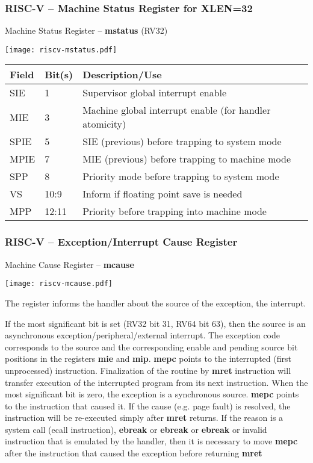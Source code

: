\documentclass{beamer}
\begin{document}
\begin{frame}
\frametitle{RISC-V -- Machine Status Register for XLEN=32}

Machine Status Register -- \textbf{mstatus} (RV32)

\begin{center}
  \texttt{[image: riscv-mstatus.pdf]}
\end{center}

\begin{tabular}{|l|l|l|}  \hline
Field & Bit(s) & Description/Use \\\hline
SIE & 1 & Supervisor global interrupt enable \\\hline
MIE & 3 & Machine global interrupt enable (for handler atomicity) \\\hline
SPIE & 5 & SIE (previous) before trapping to system mode \\\hline
MPIE & 7 & MIE (previous) before trapping to machine mode \\\hline
SPP & 8 & Priority mode before trapping to system mode \\\hline
VS & 10:9 & Inform if floating point save is needed \\\hline
MPP & 12:11 & Priority before trapping into machine mode \\\hline
\end{tabular}
\end{frame}

\begin{frame}
\frametitle{RISC-V -- Exception/Interrupt Cause Register}

Machine Cause Register -- \textbf{mcause}

\begin{center}
  \texttt{[image: riscv-mcause.pdf]}
\end{center}

\small
The register informs the handler about the source of the exception, the interrupt.

If the most significant bit is set (RV32 bit 31, RV64 bit 63), then the source is an asynchronous exception/peripheral/external interrupt. The exception code corresponds to the source and the corresponding enable and pending source bit positions in the registers \textbf{mie} and \textbf{mip}. \textbf{mepc} points to the interrupted (first unprocessed) instruction. Finalization of the routine by \textbf{mret} instruction will transfer execution of the interrupted program from its next instruction. When the most significant bit is zero, the exception is a synchronous source. \textbf{mepc} points to the instruction that caused it. If the cause (e.g. page fault) is resolved, the instruction will be re-executed simply after \textbf{mret} returns. If the reason is a system call (ecall instruction), \textbf{ebreak} or \textbf{ebreak} or \textbf{ebreak} or invalid instruction that is emulated by the handler, then it is necessary to move \textbf{mepc} after the instruction that caused the exception before returning \textbf{mret}

\end{frame}
\end{document}
